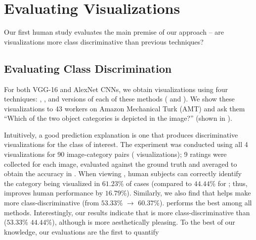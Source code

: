 \vspace{-10pt}
\section{Evaluating Visualizations}\label{sec:human_evaluation}

Our first human study evaluates the main premise of our approach -- are \gcam{} visualizations more
class discriminative than previous techniques?

\vspace{-15pt}
\subsection{Evaluating Class Discrimination} \label{sec:class_disc}

For both VGG-16 and AlexNet CNNs, we obtain  visualizations using four techniques:
\dec{}, \gb{}, and \gcam{} versions of each of these methods (\cdec{} and \cgb{}).
We show these visualizations to 43 workers on Amazon Mechanical Turk (AMT) and ask
them ``Which of the two object categories is depicted in the image?''
(shown in ).





Intuitively, a good prediction explanation is one that produces discriminative visualizations for the class of interest.
The experiment was conducted using all 4 visualizations for 90 image-category pairs ( visualizations); 9 ratings were collected for each image,
evaluated against the ground truth and averaged to obtain the accuracy in .
When viewing \cgb{}, human subjects can correctly identify the category being visualized in $61.23$\%
of cases (compared to $44.44$\% for \gb{}; thus, \gcam{} improves human performance by $16.79$\%).
Similarly, we also find that \gcam{} helps make \dec{} more class-discriminative
(from $53.33$\% $\rightarrow$ $60.37$\%). \cgb{} performs the best among all methods.
Interestingly, our results indicate that \dec{} is more class-discriminative
than \gb{} ($53.33$\% \vs $44.44$\%),
although \gb{} is more aesthetically pleasing.
To the best of our knowledge, our evaluations are the first to quantify 



